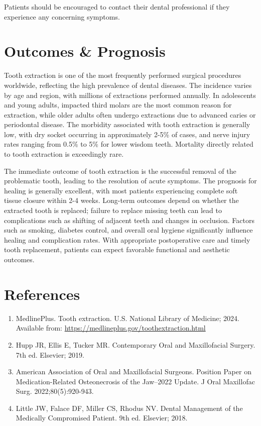 Patients should be encouraged to contact their dental professional if they experience any concerning symptoms.

\section*{Outcomes \& Prognosis}
Tooth extraction is one of the most frequently performed surgical procedures worldwide, reflecting the high prevalence of dental diseases. The incidence varies by age and region, with millions of extractions performed annually. In adolescents and young adults, impacted third molars are the most common reason for extraction, while older adults often undergo extractions due to advanced caries or periodontal disease. The morbidity associated with tooth extraction is generally low, with dry socket occurring in approximately 2-5\% of cases, and nerve injury rates ranging from 0.5\% to 5\% for lower wisdom teeth. Mortality directly related to tooth extraction is exceedingly rare.

The immediate outcome of tooth extraction is the successful removal of the problematic tooth, leading to the resolution of acute symptoms. The prognosis for healing is generally excellent, with most patients experiencing complete soft tissue closure within 2-4 weeks. Long-term outcomes depend on whether the extracted tooth is replaced; failure to replace missing teeth can lead to complications such as shifting of adjacent teeth and changes in occlusion. Factors such as smoking, diabetes control, and overall oral hygiene significantly influence healing and complication rates. With appropriate postoperative care and timely tooth replacement, patients can expect favorable functional and aesthetic outcomes.

\section*{References}
\begin{enumerate}
  \item MedlinePlus. Tooth extraction. U.S. National Library of Medicine; 2024. Available from: \url{https://medlineplus.gov/toothextraction.html}
  
  \item Hupp JR, Ellis E, Tucker MR. Contemporary Oral and Maxillofacial Surgery. 7th ed. Elsevier; 2019.
  
  \item American Association of Oral and Maxillofacial Surgeons. Position Paper on Medication-Related Osteonecrosis of the Jaw--2022 Update. J Oral Maxillofac Surg. 2022;80(5):920-943.
  
  \item Little JW, Falace DF, Miller CS, Rhodus NV. Dental Management of the Medically Compromised Patient. 9th ed. Elsevier; 2018.
\end{enumerate}

\clearpage

